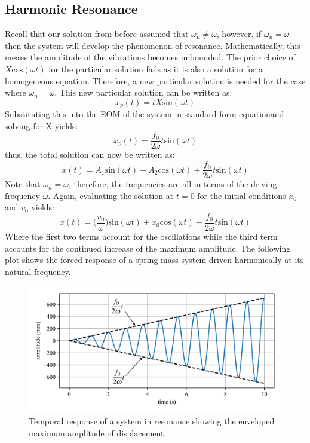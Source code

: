 \documentclass[12pt,letter]{article}
\begin{document}
	
\subsection{Harmonic Resonance}			
	
 Recall that our solution from before assumed that $\omega_n \neq \omega$, however, if $\omega_n = \omega$ then the system will develop the phenomenon of resonance. Mathematically, this means the amplitude of the vibrations becomes unbounded. The prior choice of $X\text{cos}(\omega t)$ for the particular solution fails as it is also a solution for a homogeneous equation. Therefore, a new particular solution is needed for the case where $\omega_n = \omega$. This new particular solution can be written as:
	\begin{equation}
		x_p(t) = t X\text{sin}(\omega t)
	\end{equation}				
	Substituting this into the EOM of the system in standard form equation\footnotemark[1] and solving for X yields:
	\begin{equation}
		x_p(t) = \frac{f_0}{2 \omega} t \text{sin}(\omega t)
	\end{equation}	
	thus, the total solution can now be written as:
	\begin{equation}
		x(t) = A_1\text{sin}(\omega t) + A_2\text{cos}(\omega t) + \frac{f_0}{2 \omega} t \text{sin}(\omega t)
	\end{equation}			
	Note that $\omega_n=\omega$, therefore, the frequencies are all in terms of the driving frequency $\omega$. Again, evaluating the solution at $t=0$ for the initial conditions $x_0$ and $v_0$ yields:
	\begin{equation}
		x(t) = \Big(\frac{v_0}{\omega}\Big)\text{sin}(\omega t) + x_0\text{cos}(\omega t) + \frac{f_0}{2 \omega} t \text{sin}(\omega t)
	\end{equation}			
	Where the first two terms account for the oscillations while the third term accounts for the continued increase of the maximum amplitude. The following plot shows the forced response of a spring-mass system driven harmonically at its natural frequency.
	\begin{figure}[H]
		\centering
		\includegraphics[]{../figures/resonance.png}
		\caption{Temporal response of a system in resonance showing the enveloped maximum amplitude of displacement.}
	\end{figure}				
\end{document}
